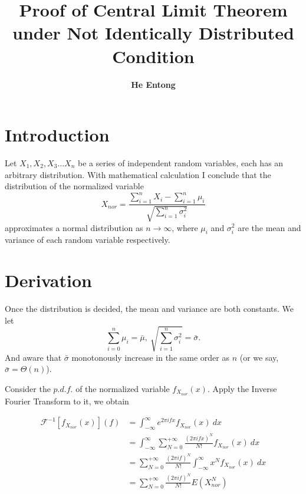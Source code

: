 \documentclass[11pt]{article}
\title{ Proof of Central Limit Theorem under Not Identically Distributed Condition}
\author{\textbf{He Entong}}
\date{}
\begin{document}
\maketitle

\section{Introduction}
Let $X_1, X_2,X_3 ... X_n$ be a series of independent random variables, each has an arbitrary distribution. With mathematical calculation I conclude that the distribution of the normalized variable 
\begin{equation}
    X_{nor} = \frac{\sum_{i = 1}^n X_i - \sum_{i=1}^n \mu_i}{\sqrt{\sum_{i=1}^n \sigma^2_{i}}}
\end{equation}  approximates a normal distribution as $n \rightarrow \infty$, where $\mu_i$ and $\sigma^2_i$ are the mean and variance of each random variable respectively.

\section{Derivation}
Once the distribution is decided, the mean and variance are both constants. We let 
\begin{equation}
    \sum_{i=0}^n \mu_i = \bar \mu,~
    \sqrt{\sum_{i=1}^n \sigma_i^2} = \bar \sigma.
\end{equation}
And aware that $\bar \sigma$ monotonously increase in the same order  as $n$ (or we say, $\bar \sigma = \Theta(n)$). \par
\indent Consider the $p.d.f.$ of the normalized variable $f_{X_{nor}}(x)$. Apply the Inverse Fourier Transform to it, we obtain

\begin{equation}
\begin{aligned}
    \mathscr{F}^{-1}[f_{X_{nor}}(x)](f) &= \int_{-\infty}^{\infty} e^{2 \pi i f x} f_{X_{nor}}(x)~dx \\
    & = \int^{\infty}_{-\infty} \sum^{+\infty}_{N = 0}\frac{(2 \pi i f x)^N}{N!} f_{X_{nor}}(x)~dx \\ 
    & = \sum^{+\infty}_{N = 0} \frac{(2 \pi i f)^N}{N!} \int^{\infty}_{-\infty} x^N f_{X_{nor}}(x) ~dx \\
    & = \sum^{+\infty}_{N=0} \frac{(2 \pi i f)^N}{N!} E(X_{nor}^N)
\end{aligned}
\end{equation}
\end{document}
